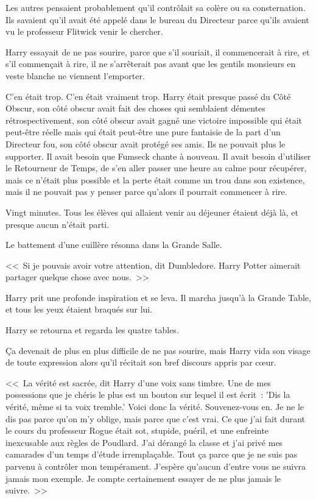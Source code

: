 Les autres pensaient probablement qu'il contrôlait sa colère ou sa consternation. Ils savaient qu'il avait été appelé dans le bureau du Directeur parce qu'ils avaient vu le professeur Flitwick venir le chercher.

Harry essayait de ne pas sourire, parce que s'il souriait, il commencerait à rire, et s'il commençait à rire, il ne s'arrêterait pas avant que les gentils monsieurs en veste blanche ne viennent l'emporter.

C'en était trop. C'en était vraiment trop. Harry était presque passé du Côté Obscur, son côté obscur avait fait des choses qui semblaient démentes rétrospectivement, son côté obscur avait gagné une victoire impossible qui était peut-être réelle mais qui était peut-être une pure fantaisie de la part d'un Directeur fou, son côté obscur avait protégé ses amis. Ils ne pouvait plus le supporter. Il avait besoin que Fumseck chante à nouveau. Il avait besoin d'utiliser le Retourneur de Temps, de s'en aller passer une heure au calme pour récupérer, mais ce n'était plus possible et la perte était comme un trou dans son existence, mais il ne pouvait pas y penser parce qu'alors il pourrait commencer à rire.

Vingt minutes. Tous les élèves qui allaient venir au déjeuner étaient déjà là, et presque aucun n'était parti.

Le battement d'une cuillère résonna dans la Grande Salle.

<<~Si je pouvais avoir votre attention, dit Dumbledore. Harry Potter aimerait partager quelque chose avec nous.~>>

Harry prit une profonde inspiration et se leva. Il marcha jusqu'à la Grande Table, et tous les yeux étaient braqués sur lui.

Harry se retourna et regarda les quatre tables.

Ça devenait de plus en plus difficile de ne pas sourire, mais Harry vida son visage de toute expression alors qu'il récitait son bref discours appris par cœur.

<<~La vérité est sacrée, dit Harry d'une voix sans timbre. Une de mes possessions que je chéris le plus est un bouton sur lequel il est écrit~: 'Dis la vérité, même si ta voix tremble.' Voici donc la vérité. Souvenez-vous en. Je ne le dis pas parce qu'on m'y oblige, mais parce que c'est vrai. Ce que j'ai fait durant le cours du professeur Rogue était sot, stupide, puéril, et une enfreinte inexcusable aux règles de Poudlard. J'ai dérangé la classe et j'ai privé mes camarades d'un temps d'étude irremplaçable. Tout ça parce que je ne suis pas parvenu à contrôler mon tempérament. J'espère qu'aucun d'entre vous ne suivra jamais mon exemple. Je compte certainement essayer de ne plus jamais le suivre.~>>

